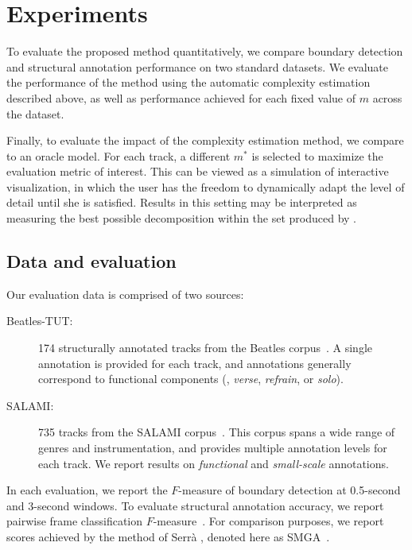 \documentclass{article}
\begin{document}

\section{Experiments}
To evaluate the proposed method quantitatively, we compare boundary detection and
structural annotation performance on two standard datasets.  We evaluate the
performance of the method using the automatic complexity estimation described above,
as well as performance achieved for each fixed value of $m$ across the dataset.

Finally, to evaluate the impact of the complexity estimation method, we compare to an
oracle model. For each track, a different $m^*$ is selected to maximize the
evaluation metric of interest.  This can be viewed as a simulation of interactive
visualization, in which the user has the freedom to dynamically adapt the level of
detail until she is satisfied.  Results in this setting may be interpreted as
measuring the best possible decomposition within the set produced by
.

\subsection{Data and evaluation}
Our evaluation data is comprised of two sources:
\begin{description}
\item[Beatles-TUT:]
174 structurally annotated tracks from the Beatles corpus~\cite{paulus2006music}.  A single
annotation is provided for each track, and annotations generally correspond to
functional components (\eg, \emph{verse}, \emph{refrain}, or \emph{solo}).
\item[SALAMI:] 735 tracks from the SALAMI corpus~\cite{smith2011design}.  This corpus
spans a wide range of genres and instrumentation, and provides multiple
annotation levels for each track.  We report results on \emph{functional} 
and \emph{small-scale} annotations.
\end{description}

In each evaluation, we report the $F$-measure of boundary detection at 0.5-second and
3-second windows.  To evaluate structural annotation accuracy, we report pairwise frame 
classification $F$-measure~\cite{levy2008structural}.  
For comparison purposes, we report scores achieved by the method of 
Serr\`{a} \etal, denoted here as SMGA~\cite{serra2014unsupervised}.
\end{document}
